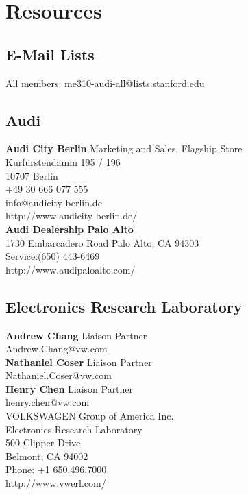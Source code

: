 \chapter{Resources}
\label{cha:resources}
\vspace{1em}
\section{E-Mail Lists}
All members: me310-audi-all@lists.stanford.edu\\

\section{Audi}
\textbf{Audi City Berlin} Marketing and Sales, Flagship Store\\
Kurfürstendamm 195 / 196\\
10707 Berlin\\
+49 30 666 077 555\\
info@audicity-berlin.de\\
http://www.audicity-berlin.de/\\
\bigskip
 \noindent\textbf{Audi Dealership Palo Alto}\\
1730 Embarcadero Road Palo Alto, CA	94303\\
Service:(650) 443-6469\\
http://www.audipaloalto.com/\\

\section{Electronics Research Laboratory}


\vspace{5mm}
\noindent\textbf{Andrew Chang} Liaison Partner  \\
Andrew.Chang@vw.com\\
\vspace{5mm} %
\noindent\textbf{Nathaniel Coser} Liaison Partner\\
Nathaniel.Coser@vw.com\\
\vspace{5mm} %
\noindent\textbf{Henry Chen} Liaison Partner\\
henry.chen@vw.com\\
\vspace{5mm} %
VOLKSWAGEN Group of America Inc. \\
Electronics Research Laboratory \\
500 Clipper Drive \\
Belmont, CA 94002 \\
Phone: +1 650.496.7000 \\
http://www.vwerl.com/ \\

